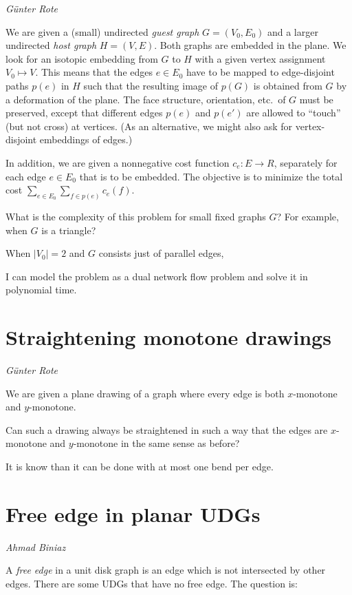 \documentclass{patmorin}
\begin{document}
\noindent\emph{G\"unter Rote}

We are given a (small) undirected \emph{guest graph} $G=(V_0,E_0)$
and a larger undirected \emph{host graph} $H=(V,E)$.
Both graphs are embedded in the plane.
We look for an isotopic embedding from $G$ to $H$ with
a given vertex assignment $V_0\mapsto V$. This means that
the edges $e\in E_0$ have to be mapped to edge-disjoint
paths $p(e)$ in $H$ such that the resulting image of $p(G)$ is obtained
from $G$ by a deformation of the plane. The face structure, orientation,
etc.\ of $G$ must be preserved, except that different edges $p(e)$
and $p(e')$ are allowed to ``touch'' (but not cross) at vertices.
(As an alternative, we might also ask for vertex-disjoint embeddings of edges.)

In addition, we are given a nonnegative cost function
$c_e\colon E\to R$, separately for each edge $e\in E_0$ that is to be embedded.
The objective is to minimize the total cost
$\sum_{e\in E_0} \sum_{f \in p(e)} c_e(f)$.

What is the complexity of this problem for small fixed
graphs $G$? For example, when $G$ is a triangle?

When $|V_0|=2$ and $G$ consists just of parallel edges,

I can model the problem as a dual network flow problem and solve it
in polynomial time.

\section{Straightening monotone drawings}

\noindent\emph{G\"unter Rote}

We are given a plane drawing of a graph where every
edge is both $x$-monotone and $y$-monotone.
\begin{op}
Can such a drawing always be straightened in such a way
that the edges are $x$-monotone and $y$-monotone
in the same sense as before?
\end{op}
It is know than it can be done with at most one bend per edge.

\section{Free edge in planar UDGs}

\noindent\emph{Ahmad Biniaz}

A \emph{free edge} in a unit disk graph is an edge which is not
intersected by other edges. There are some UDGs that have no free
edge. The question is:
\end{document}
